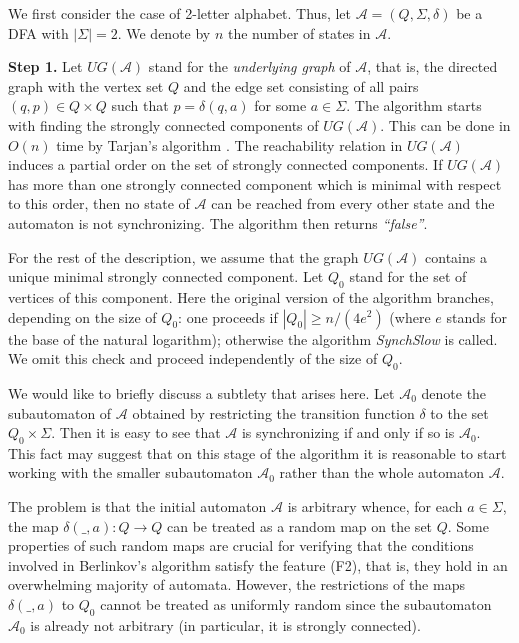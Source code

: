 \documentclass{llncs}
\begin{document}
We first consider the case of 2-letter alphabet. Thus, let $\mathcal{A}=(Q, \Sigma, \delta)$  be a DFA with $|\Sigma|=2$. We denote by $n$ the number of states in $\mathcal{A}$.

\smallskip

\textbf{Step 1.} Let $U\!G(\mathcal{A})$ stand for the \emph{underlying graph} of $\mathcal{A}$, that is, the directed graph with the vertex set $Q$ and the edge set consisting of all pairs $(q,p)\in Q\times Q$ such that $p=\delta(q,a)$ for some $a \in \Sigma$. The algorithm starts with finding the strongly connected components of $U\!G(\mathcal{A})$. This can be done in $O(n)$ time by Tarjan's algorithm \cite{Tarjan:72}. The reachability relation in $U\!G(\mathcal{A})$ induces a partial order on the set of strongly connected components. If $U\!G(\mathcal{A})$ has more than one strongly connected component which is minimal with respect to this order, then no state of $\mathcal{A}$ can be reached from every other state and the automaton is not synchronizing. The algorithm then returns \emph{``false''}.

For the rest of the description, we assume that the graph $U\!G(\mathcal{A})$ contains a unique minimal strongly connected component. Let $Q_0$ stand for the set of vertices of this component. Here the original version of the algorithm branches, depending on the size of $Q_0$: one proceeds if $|Q_0|\ge n/(4e^2)$ (where $e$ stands for the base of the natural logarithm); otherwise the algorithm \emph{SynchSlow} is called. We omit this check and proceed independently of the size of $Q_0$.

\begin{remark}
\label{rem:scc}
We would like to briefly discuss a subtlety that arises here. Let $\mathcal{A}_0$ denote the subautomaton of $\mathcal{A}$ obtained by restricting the transition function $\delta$ to the set $Q_0\times\Sigma$. Then it is easy to see that $\mathcal{A}$ is synchronizing if and only if so is $\mathcal{A}_0$. This fact may suggest that on this stage of the algorithm it is reasonable to start working with the smaller subautomaton $\mathcal{A}_0$ rather than the whole automaton $\mathcal{A}$.

The problem is that the initial automaton $\mathcal{A}$ is arbitrary whence, for each $a\in\Sigma$, the map $\delta(\_,a)\colon Q\to Q$ can be treated as a random map on the set $Q$. Some properties of such random maps are crucial for verifying that the conditions involved in Berlinkov's algorithm satisfy the feature (F2), that is, they hold in an overwhelming majority of automata. However, the restrictions of the maps $\delta(\_,a)$ to $Q_0$ cannot be treated as uniformly random since the subautomaton $\mathcal{A}_0$ is already not arbitrary (in particular, it is strongly connected).
\end{remark}
\end{document}
